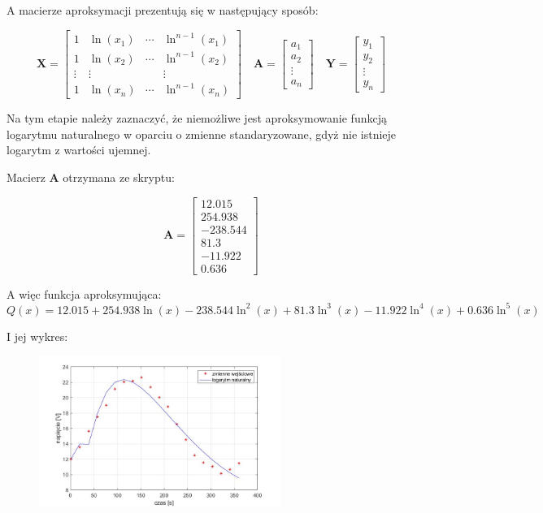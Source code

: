 \documentclass[a4paper, 12pt]{mwart}
\begin{document}
				A macierze aproksymacji prezentują się w następujący sposób:
	
				$$ \textbf{X} = \begin{bmatrix}
					1      & \ln \left(x_1\right) & \cdots & \ln^{n-1} \left(x_1\right)\\
					1      & \ln \left(x_2\right) & \cdots & \ln^{n-1} \left(x_2\right)\\
					\vdots & \vdots               &        & \vdots \\
					1      & \ln \left(x_n\right) & \cdots & \ln^{n-1} \left(x_n\right)
				\end{bmatrix}
				\quad 
				\textbf{A} = \begin{bmatrix}
					a_1\\
					a_2\\
					\vdots\\
					a_n
				\end{bmatrix} \quad
				\textbf{Y} = \begin{bmatrix}
					y_1\\
					y_2\\
					\vdots\\
					y_n
				\end{bmatrix}$$	

				Na tym etapie należy zaznaczyć, że niemożliwe jest aproksymowanie funkcją logarytmu
				naturalnego w oparciu o zmienne standaryzowane, gdyż nie istnieje logarytm z wartości
				ujemnej.

				Macierz $\textbf{A}$ otrzymana ze skryptu:

				$$\textbf{A} = \begin{bmatrix}
					12.015\\
					254.938\\
					-238.544\\
					81.3\\
					-11.922\\
					0.636
				\end{bmatrix}$$

				A więc funkcja aproksymująca:
				$$Q(x) = 12.015 + 254.938 \ln \left(x\right) - 238.544 \ln^2 \left(x\right)
				+ 81.3 \ln^3 \left(x\right) - 11.922 \ln^4 \left(x\right) + 0.636 \ln^5 \left(x\right)$$

				I jej wykres:
				\begin{figure}[h]
					\begin{center}
						\includegraphics[width = 0.7\textwidth]{graphs/4-n.jpg}
					\end{center}
				\end{figure}
\end{document}
